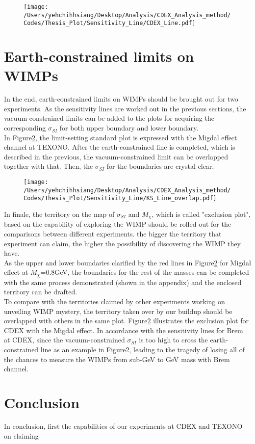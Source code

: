         \begin{figure}[h]
        \texttt{[image: /Users/yehchihhsiang/Desktop/Analysis/CDEX\_Analysis\_method/Codes/Thesis\_Plot/Sensitivity\_Line/CDEX\_Line.pdf]}
        \centering
        \caption{} \label{Vacuum-constrained WIMPs}
        \end{figure}

\section{Earth-constrained limits on WIMPs}
In the end, earth-constrained limits on WIMPs should be brought out for two experiments. As the sensitivity lines are worked out in the previous sections, the vacuum-constrained limits can be added to the plots for acquiring the corresponding $\sigma_{SI}$ for both upper boundary and lower boundary.\\

In Figure\ref{}, the limit-setting standard plot is expressed with the Migdal effect channel at TEXONO. After the earth-constrained line is completed, which is described in the previous, the  
vacuum-constrained limit can be overlapped together with that. Then, the $\sigma_{SI}$ for the boundaries are crystal clear. 
         \begin{figure}[h]
        \texttt{[image: /Users/yehchihhsiang/Desktop/Analysis/CDEX\_Analysis\_method/Codes/Thesis\_Plot/Sensitivity\_Line/KS\_Line\_overlap.pdf]}
        \centering
        \caption{} \label{Vacuum-constrained WIMPs}
        \end{figure}
        
In finale, the territory on the map of $\sigma_{SI}$ and $M_{\chi}$, which is called "exclusion plot",  based on the capability of exploring the WIMP should be rolled out for the comparisons between different experiments. the bigger the territory that experiment can claim, the higher the possibility of discovering the WIMP they have.\\

As the upper and lower boundaries clarified by the red lines in Figure\ref{} for Migdal effect at $M_{\chi}$=0.8GeV, the boundaries for the rest of the masses can be completed with the same process demonstrated (shown in the appendix) and the enclosed territory can be drafted.\\

To compare with the territories claimed by other experiments working on unveiling WIMP mystery, the territory taken over by our buildup should be overlapped with others in the same plot. Figure\ref{} illustrates the exclusion plot for CDEX with the Migdal effect. In accordance with the sensitivity lines for Brem at CDEX, since the vacuum-constrained $\sigma_{SI}$ is too high to cross the earth-constrained line as an example in Figure\ref{}, leading to the tragedy of losing all of the chances to measure the WIMPs from sub-GeV to GeV mass with Brem channel.

\section{Conclusion}
In conclusion, first the capabilities of our experiments at CDEX and TEXONO on claiming 


